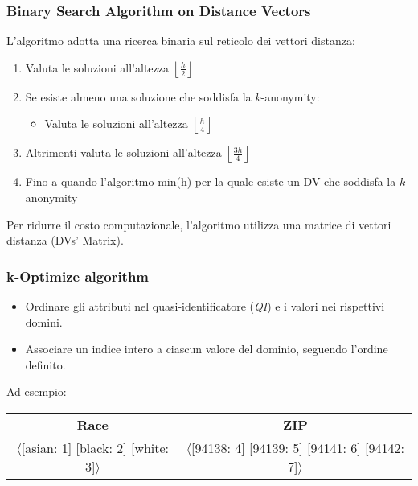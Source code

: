 \documentclass{report}
\begin{document}
\subsubsection{Binary Search Algorithm on Distance Vectors}
L'algoritmo adotta una ricerca binaria sul reticolo dei vettori distanza:

\begin{enumerate}
    \item Valuta le soluzioni all'altezza \( \left\lfloor \frac{h}{2} \right\rfloor \)
    \item Se esiste almeno una soluzione che soddisfa la \( k \)-anonymity:
    \begin{itemize}
        \item Valuta le soluzioni all'altezza \( \left\lfloor \frac{h}{4} \right\rfloor \)
    \end{itemize}
    \item Altrimenti valuta le soluzioni all'altezza \( \left\lfloor \frac{3h}{4} \right\rfloor \)
    \item Fino a quando l'algoritmo min(h) per la quale esiste un DV che soddisfa la \( k \)-anonymity
\end{enumerate}

\noindent Per ridurre il costo computazionale, l'algoritmo utilizza una matrice di vettori distanza (DVs' Matrix).

\subsubsection{k-Optimize algorithm}

\begin{itemize}
    \item Ordinare gli attributi nel quasi-identificatore (\textit{QI}) e i valori nei rispettivi domini.
    \item Associare un indice intero a ciascun valore del dominio, seguendo l'ordine definito.
\end{itemize}

\noindent Ad esempio:
\begin{center}
    \begin{tabular}{cc}
        \textbf{Race} & \textbf{ZIP} \\
        $\langle$[asian: 1] [black: 2] [white: 3]$\rangle$ & $\langle$[94138: 4] [94139: 5] [94141: 6] [94142: 7]$\rangle$ \\
    \end{tabular}
\end{center}
\end{document}
